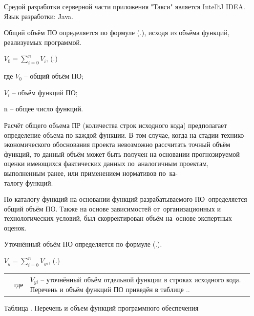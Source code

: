 {\gostFont
	\par \redline Средой разработки серверной части приложения "Такси"{} является IntelliJ IDEA. Язык разработки: Java.
	\par \redline Общий объём ПО определяется по формуле (\thechaptercntr .\theformulacntr), исходя из объёма функций, реализуемых программой. 
	
	\formulaspace \par \redline 
	$V_0=\sum_{i=0}^{n}V_i$, 
	\hfill (\thechaptercntr .\theformulacntr) \redline
	\formulaspace \addtocounter{formulacntr}{1}
	
	\par \redline где $V_0$ {--} общий объём ПО;
	\par \redline \wherespace $V_i$ {--} объём функций ПО;
	\par \redline \wherespace n {--} общее число функций.
	\par \redline Расчёт общего объема ПР (количества строк исходного кода) предполагает определение объема по каждой функции. В том случае, когда на стадии технико-экономического обоснования проекта невозможно рассчитать точный объём функций, то данный объём может быть получен на основании прогнозируемой оценки имеющихся фактических данных по аналогичным проектам, выполненным ранее, или применением нормативов по ка-\\талогу функций. 
	
	\par \redline По каталогу функций на основании функций разрабатываемого ПО определяется общий объём ПО. Также на основе зависимостей от организационных и технологических условий, был скорректирован объём на основе экспертных оценок.
	
	\par \redline Уточнённый объём ПО определяется по формуле (\thechaptercntr .\theformulacntr).
	
	\formulaspace \par \redline 
	$V_y=\sum_{i=0}^{n}V_{yi}$,
	\hfill (\thechaptercntr .\theformulacntr) \redline
	\formulaspace \addtocounter{formulacntr}{1}
	
	\begin{tabular}{p{}p{}p{}}
		& где & $V_{yi}$ {--} уточнённый объём отдельной функции в строках исходного кода. Перечень и объём функций ПО приведён в таблице \thechaptercntr .\thetablecntr .
	\end{tabular}
	
	\topTablespace
	{\begin{Center} 
			\par Таблица \thechaptercntr .\thetablecntr \spc {--} Перечень и объем функций программного обеспечения 
			

\end{Center}}}
